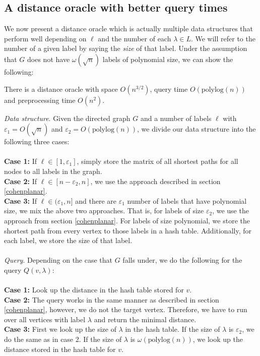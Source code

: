 \subsection{A distance oracle with better query times}
We now present a distance oracle which is actually multiple data structures that perform
well depending on $\ell$ and the number of each $\lambda\in L$. We will refer to the
number of a given label by saying the \textit{size} of that label. Under the assumption
that $G$ does not have $\omega(\sqrt{n})$ labels of polynomial size, we can show the
following:
\begin{thm}\label{thm2}
  There is a distance oracle with space $O(n^{3/2})$, query time $O(\text{polylog}(n))$ and
  preprocessing time $O(n^2)$.
\end{thm}
\textit{Data structure}. Given the directed graph $G$ and a number of labels $\ell$ with
$\varepsilon_1 = O(\sqrt{n})$ and $\varepsilon_2=O(\text{polylog}(n))$, we divide our
data structure into the following three cases: \\
\\
\textbf{Case 1:} If $\ell\in [1, \varepsilon_1]$, simply store the matrix of all shortest paths for all nodes to all
labels in the graph. \\
\textbf{Case 2:} If $\ell\in [n-\varepsilon_2, n]$, we use the approach described in section
\ref{cohenplanar}. \\
\textbf{Case 3:} If $\ell\in (\varepsilon_1, n]$ and there are $\varepsilon_1$ number of labels that have
polynomial size, we mix
the above two approaches. That is, for labels of size $\varepsilon_2$, we use the
approach from section \ref{cohenplanar}. For labels of size polynomial, we store the
shortest path from every vertex to those labels in a hash table. Additionally, for each
label, we store the size of that label. \\
\\
\textit{Query}. Depending on the case that $G$ falls under, we do the following for the
query $Q(v, \lambda)$: \\
\\
\textbf{Case 1:} Look up the distance in the hash table stored for $v$. \\
\textbf{Case 2:} The query works in the same manner as described in section
\ref{cohenplanar}, however, we do not the target vertex. Therefore, we have to run over
all vertices with label $\lambda$ and return the minimal distance. \\
\textbf{Case 3:} First we look up the size of $\lambda$ in the hash table. If the size of
$\lambda$ is $\varepsilon_2$, we do the same as in case 2. If the size of $\lambda$ is
$\omega(\text{polylog}(n))$, we look up the distance stored in the hash table for $v$.

